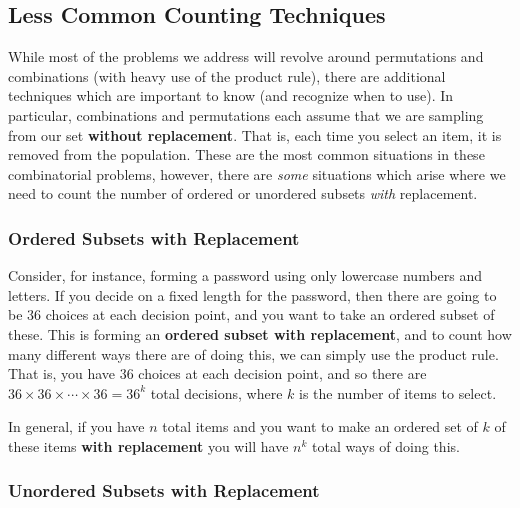 \documentclass[
  letterpaper,
  DIV=11,
  numbers=noendperiod]{scrreprt}
\theoremstyle{definition}
\theoremstyle{definition}
\theoremstyle{definition}
\theoremstyle{remark}
\begin{document}
\subsection{Less Common Counting
Techniques}\label{less-common-counting-techniques}

While most of the problems we address will revolve around permutations
and combinations (with heavy use of the product rule), there are
additional techniques which are important to know (and recognize when to
use). In particular, combinations and permutations each assume that we
are sampling from our set \textbf{without replacement}. That is, each
time you select an item, it is removed from the population. These are
the most common situations in these combinatorial problems, however,
there are \emph{some} situations which arise where we need to count the
number of ordered or unordered subsets \emph{with} replacement.

\subsubsection{Ordered Subsets with
Replacement}\label{ordered-subsets-with-replacement}

Consider, for instance, forming a password using only lowercase numbers
and letters. If you decide on a fixed length for the password, then
there are going to be \(36\) choices at each decision point, and you
want to take an ordered subset of these. This is forming an
\textbf{ordered subset with replacement}, and to count how many
different ways there are of doing this, we can simply use the product
rule. That is, you have \(36\) choices at each decision point, and so
there are \(36\times 36\times\cdots\times 36 = 36^k\) total decisions,
where \(k\) is the number of items to select.

In general, if you have \(n\) total items and you want to make an
ordered set of \(k\) of these items \textbf{with replacement} you will
have \(n^k\) total ways of doing this.

\subsubsection{Unordered Subsets with
Replacement}\label{unordered-subsets-with-replacement}
\end{document}
